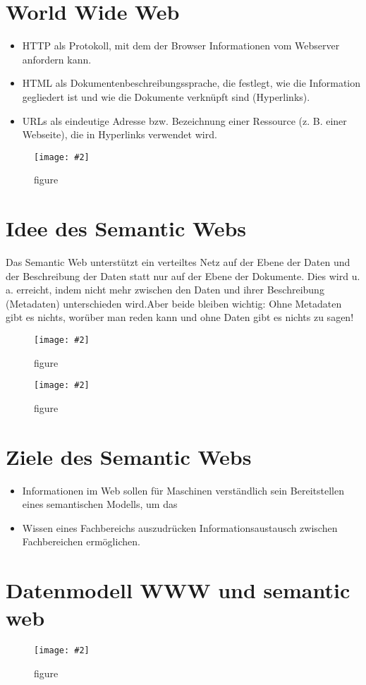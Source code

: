 \documentclass[a4paper,10pt,titlepage=false]{scrreprt}
\newcommand{\pic}[2][figure]{\begin{figure}[h]
 \centering
 \texttt{[image: \#2]}
 \caption{#1}
\end{figure}
}
\begin{document}
\section{World Wide Web} %
\label{sec:world_wide_web}
\begin{itemize}
  \item HTTP als Protokoll, mit dem der Browser
Informationen vom Webserver anfordern kann.
\item HTML als Dokumentenbeschreibungssprache, die
festlegt, wie die Information gegliedert ist und wie die
Dokumente verknüpft sind (Hyperlinks).
\item URLs als eindeutige Adresse bzw. Bezeichnung einer
Ressource (z. B. einer Webseite), die in Hyperlinks
verwendet wird.
\end{itemize}
\pic{sweb.png}

\section{Idee des Semantic Webs} %
\label{sec:idee_des_semantic_webs}
Das Semantic Web unterstützt ein verteiltes Netz auf der
Ebene der Daten und der Beschreibung der Daten statt nur
auf der Ebene der Dokumente.
Dies wird u. a. erreicht, indem nicht mehr zwischen den
Daten und ihrer Beschreibung (Metadaten) unterschieden
wird.Aber beide bleiben wichtig:
Ohne Metadaten gibt es nichts,
worüber man reden kann und
ohne Daten gibt es nichts zu sagen!

\pic{sweb2.png}
\pic{sweb3.png}

\section{Ziele des Semantic Webs} %
\label{sec:ziele_des_semantic_webs}
\begin{itemize}
  \item Informationen im Web sollen für Maschinen
verständlich sein
Bereitstellen eines semantischen Modells, um das
\item Wissen eines Fachbereichs auszudrücken
Informationsaustausch zwischen Fachbereichen
ermöglichen.
\end{itemize}
\section{Datenmodell WWW und semantic web} %
\label{sec:datenmodell_www}
\pic{dmweb.png}
\end{document}
